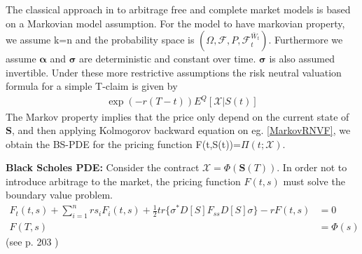 The classical approach in \parencite{B-S-Paper} to arbitrage free and complete market models is based on a Markovian model assumption. For the model to have markovian property, we assume k=n and the probability space is $(\Omega, \mathcal{F}, P, \mathcal{F}_t^{\bar{W}_t})$. Furthermore we assume $\bm{\alpha}$ and $\bm{\sigma}$ are deterministic and constant over time. $\bm{\sigma}$ is also assumed invertible. Under these more restrictive assumptions the risk neutral valuation formula for a simple T-claim is given by
\begin{align}\label{MarkovRNVF}
\exp(-r(T-t))E^Q[\mathcal{X}|S(t)]
\end{align}
The Markov property implies that the price only depend on the current state of $\bm{S}$, and then applying Kolmogorov backward equation on eg. \ref{MarkovRNVF}, we obtain the BS-PDE for the pricing function F(t,S(t))=$\Pi(t; \mathcal{X})$.

\begin{theorem}\label{BSPDEMultiDim}
\textbf{Black Scholes PDE: } Consider the contract $\mathcal{X}=\Phi(\bm{S}(T))$. In order not to introduce arbitrage to the market, the pricing function $F(t,s)$ must solve the boundary value problem.
\begin{equation}
\begin{split}
F_t(t,s)+\sum_{i=1}^{n} rs_iF_i(t,s)+\frac{1}{2} tr\{\sigma^* D[S] F_{ss} D[S] \sigma\} -rF(t,s)&=0\\
F(T,s)&=\Phi(s)
\end{split}
\end{equation}
(see p. 203 \parencite{finKont})
\end{theorem}


